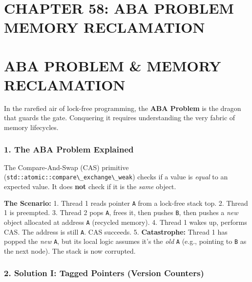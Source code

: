 \hypertarget{chapter-58-aba-problem-memory-reclamation}{%
\section{CHAPTER 58: ABA PROBLEM MEMORY
RECLAMATION}\label{chapter-58-aba-problem-memory-reclamation}}

\hypertarget{aba-problem-memory-reclamation}{%
\section{ABA PROBLEM \& MEMORY
RECLAMATION}\label{aba-problem-memory-reclamation}}

In the rarefied air of lock-free programming, the \textbf{ABA Problem}
is the dragon that guards the gate. Conquering it requires understanding
the very fabric of memory lifecycles.

\hypertarget{the-aba-problem-explained}{%
\subsubsection{1. The ABA Problem
Explained}\label{the-aba-problem-explained}}

The Compare-And-Swap (CAS) primitive
(\passthrough{\lstinline!std::atomic::compare\_exchange\_weak!}) checks
if a value is \emph{equal} to an expected value. It does \textbf{not}
check if it is the \emph{same} object.

\textbf{The Scenario:} 1. Thread 1 reads pointer
\passthrough{\lstinline!A!} from a lock-free stack top. 2. Thread 1 is
preempted. 3. Thread 2 pops \passthrough{\lstinline!A!}, frees it, then
pushes \passthrough{\lstinline!B!}, then pushes a \emph{new} object
allocated at address \passthrough{\lstinline!A!} (recycled memory). 4.
Thread 1 wakes up, performs CAS. The address is still
\passthrough{\lstinline!A!}. CAS succeeds. 5. \textbf{Catastrophe:}
Thread 1 has popped the \emph{new} \passthrough{\lstinline!A!}, but its
local logic assumes it's the \emph{old} \passthrough{\lstinline!A!}
(e.g., pointing to \passthrough{\lstinline!B!} as the next node). The
stack is now corrupted.

\hypertarget{solution-i-tagged-pointers-version-counters}{%
\subsubsection{2. Solution I: Tagged Pointers (Version
Counters)}\label{solution-i-tagged-pointers-version-counters}}

